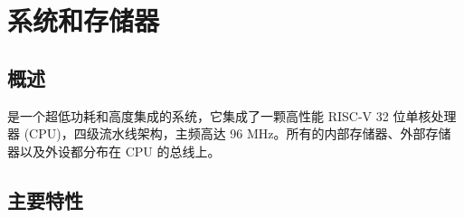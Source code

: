 \documentclass[main\_\_CN.tex]{subfiles}
\begin{document}

\ifglobal
\else
    {\let\clearpage\relax \listoftodos}
    {\let\clearpage\relax \listofdonetodos}
    \tableofcontents
\fi



\hypertarget{sysmem}{}
\chapter{系统和存储器}
\label{mod:sysmem}

\section{概述}

\chipname{} 是一个超低功耗和高度集成的系统，它集成了一颗高性能 RISC-V 32 位单核处理器 (CPU)，四级流水线架构，主频高达 96 MHz。所有的内部存储器、外部存储器以及外设都分布在 CPU 的总线上。



\section{主要特性}
\end{document}
